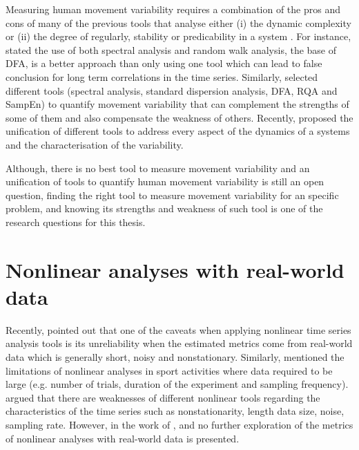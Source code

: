 Measuring human movement variability requires a combination of the 
pros and cons of many of the previous tools that analyse either 
(i) the dynamic complexity or (ii) the degree of regularly, stability or 
predicability in a system \citep{goldberger2002b, harbourne2009, stergiou2011}.
For instance, \cite{rangarajan2000} stated the use of both spectral analysis 
and random walk analysis, the base of DFA, is a better approach than only 
using one tool which can lead to false conclusion for long term correlations
in the time series.
Similarly, \cite{wijnants2009} selected different tools (spectral analysis, 
standard dispersion analysis, DFA, RQA and SampEn) to quantify movement 
variability that can complement the strengths of some of them and also 
compensate the weakness of others. Recently, \cite{caballero2014} proposed 
the unification of different tools to address every aspect of the dynamics 
of a systems and the characterisation of the variability. 

Although, there is no best tool to measure movement variability and an 
unification of tools to quantify human movement variability is still an 
open question, finding the right tool to measure movement variability 
for an specific problem, and knowing its strengths and weakness of such 
tool is one of the research questions for this thesis. 


\section{Nonlinear analyses with real-world data} \label{nonlieaRealdata} 
Recently, \cite{huffaker2017} pointed out that one of the caveats 
when applying nonlinear time series analysis tools is its unreliability 
when the estimated metrics come from real-world data which is generally 
short, noisy and nonstationary. Similarly, \cite{preatoni2013} mentioned 
the limitations of nonlinear analyses in sport activities 
where data required to be large (e.g. number of trials, duration of the 
experiment and sampling frequency). \cite{caballero2014}
argued that there are weaknesses of different 
nonlinear tools regarding the characteristics of the time series such 
as nonstationarity, length data size, noise, sampling rate.
However, in the work of \cite{huffaker2017}, \cite{preatoni2013} and
\cite{caballero2014} no further exploration of the metrics of nonlinear
analyses with real-world data is presented.



